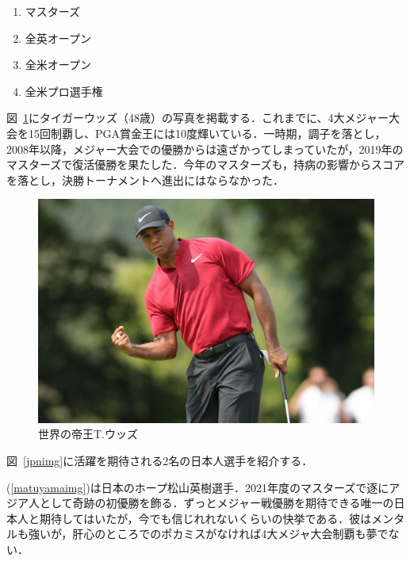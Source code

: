 \documentclass[a4j, twocolumn]{jarticle}
\begin{document}
\vspace{-15pt}

\begin{enumerate}
    \item マスターズ
    \item 全英オープン
    \item 全米オープン
    \item 全米プロ選手権
\end{enumerate}

図~\ref{tigerimg}にタイガーウッズ（48歳）の写真を掲載する．これまでに、4大メジャー大会を15回制覇し、PGA賞金王には10度輝いている．一時期，調子を落とし，2008年以降，メジャー大会での優勝からは遠ざかってしまっていたが，2019年のマスターズで復活優勝を果たした．今年のマスターズも，持病の影響からスコアを落とし，決勝トーナメントへ進出にはならなかった．\\

\begin{figure}[htb]
    \begin{center}
        \includegraphics[scale=0.07]{tiger.jpg}
        \caption{世界の帝王T.ウッズ}
        \label{tigerimg}
    \end{center}
\end{figure}

図~\ref{jpnimg}に活躍を期待される2名の日本人選手を紹介する．\\

\vspace{-15pt}

(\ref{matuyamaimg})は日本のホープ松山英樹選手．2021年度のマスターズで逐にアジア人として奇跡の初優勝を飾る．ずっとメジャー戦優勝を期待できる唯一の日本人と期待してはいたが，今でも信じれれないくらいの快挙である．彼はメンタルも強いが，肝心のところでのポカミスがなければ4大メジャ大会制覇も夢でない．\\
\end{document}
